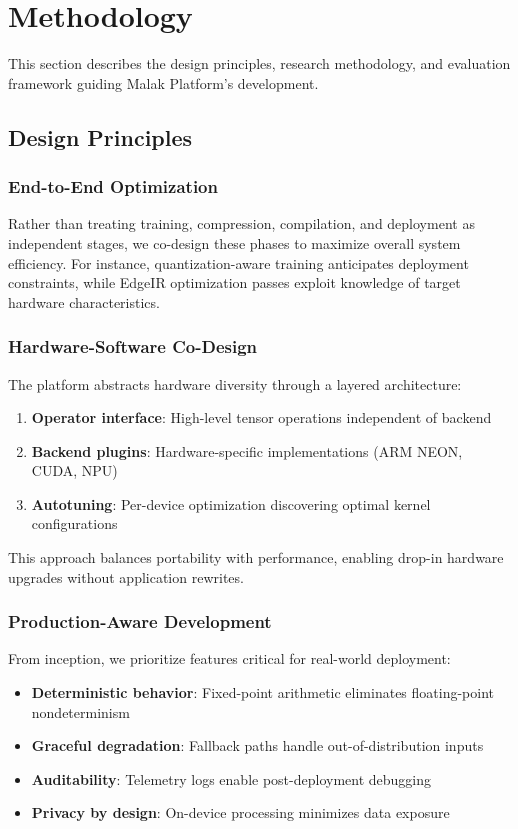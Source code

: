 \section{Methodology}

This section describes the design principles, research methodology, and evaluation framework guiding Malak Platform's development.

\subsection{Design Principles}

\subsubsection{End-to-End Optimization}
Rather than treating training, compression, compilation, and deployment as independent stages, we co-design these phases to maximize overall system efficiency. For instance, quantization-aware training anticipates deployment constraints, while EdgeIR optimization passes exploit knowledge of target hardware characteristics.

\subsubsection{Hardware-Software Co-Design}
The platform abstracts hardware diversity through a layered architecture:
\begin{enumerate}
\item \textbf{Operator interface}: High-level tensor operations independent of backend
\item \textbf{Backend plugins}: Hardware-specific implementations (ARM NEON, CUDA, NPU)
\item \textbf{Autotuning}: Per-device optimization discovering optimal kernel configurations
\end{enumerate}

This approach balances portability with performance, enabling drop-in hardware upgrades without application rewrites.

\subsubsection{Production-Aware Development}
From inception, we prioritize features critical for real-world deployment:
\begin{itemize}
\item \textbf{Deterministic behavior}: Fixed-point arithmetic eliminates floating-point nondeterminism
\item \textbf{Graceful degradation}: Fallback paths handle out-of-distribution inputs
\item \textbf{Auditability}: Telemetry logs enable post-deployment debugging
\item \textbf{Privacy by design}: On-device processing minimizes data exposure
\end{itemize}

